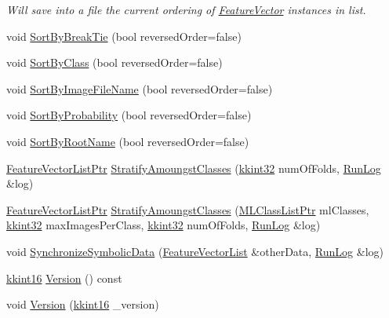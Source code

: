 \begin{DoxyCompactItemize}
\begin{DoxyCompactList}\small\item\em Will save into a file the current ordering of \hyperlink{class_k_k_m_l_l_1_1_feature_vector}{Feature\+Vector} instances in list. \end{DoxyCompactList}\item 
void \hyperlink{class_k_k_m_l_l_1_1_feature_vector_list_a21e87e9d54c668f6f2f4fd84500dcb19}{Sort\+By\+Break\+Tie} (bool reversed\+Order=false)
\item 
void \hyperlink{class_k_k_m_l_l_1_1_feature_vector_list_ad39ed98bffb33cdbb341b5f620b547c3}{Sort\+By\+Class} (bool reversed\+Order=false)
\item 
void \hyperlink{class_k_k_m_l_l_1_1_feature_vector_list_a3cfb8424a49a64301f25433e36446038}{Sort\+By\+Image\+File\+Name} (bool reversed\+Order=false)
\item 
void \hyperlink{class_k_k_m_l_l_1_1_feature_vector_list_aada2f3b4f406e863d5b9e29b3640d156}{Sort\+By\+Probability} (bool reversed\+Order=false)
\item 
void \hyperlink{class_k_k_m_l_l_1_1_feature_vector_list_a87e679a6419e6d7a1dc28a28d4cb96cb}{Sort\+By\+Root\+Name} (bool reversed\+Order=false)
\item 
\hyperlink{class_k_k_m_l_l_1_1_feature_vector_list_af22f34b214e0dd3b16760002ce392355}{Feature\+Vector\+List\+Ptr} \hyperlink{class_k_k_m_l_l_1_1_feature_vector_list_a10271db5b9466f45bb3ec138a05f209d}{Stratify\+Amoungst\+Classes} (\hyperlink{namespace_k_k_b_a8fa4952cc84fda1de4bec1fbdd8d5b1b}{kkint32} num\+Of\+Folds, \hyperlink{class_k_k_b_1_1_run_log}{Run\+Log} \&log)
\item 
\hyperlink{class_k_k_m_l_l_1_1_feature_vector_list_af22f34b214e0dd3b16760002ce392355}{Feature\+Vector\+List\+Ptr} \hyperlink{class_k_k_m_l_l_1_1_feature_vector_list_a06b49fcc006252682146bc5379790074}{Stratify\+Amoungst\+Classes} (\hyperlink{namespace_k_k_m_l_l_af091cde3f4a4315658b41a5e7583fc26}{M\+L\+Class\+List\+Ptr} ml\+Classes, \hyperlink{namespace_k_k_b_a8fa4952cc84fda1de4bec1fbdd8d5b1b}{kkint32} max\+Images\+Per\+Class, \hyperlink{namespace_k_k_b_a8fa4952cc84fda1de4bec1fbdd8d5b1b}{kkint32} num\+Of\+Folds, \hyperlink{class_k_k_b_1_1_run_log}{Run\+Log} \&log)
\item 
void \hyperlink{class_k_k_m_l_l_1_1_feature_vector_list_ae1d1b2ac35bcc178b7065fed6bb60cc0}{Synchronize\+Symbolic\+Data} (\hyperlink{class_k_k_m_l_l_1_1_feature_vector_list}{Feature\+Vector\+List} \&other\+Data, \hyperlink{class_k_k_b_1_1_run_log}{Run\+Log} \&log)
\item 
\hyperlink{namespace_k_k_b_a93809780ee294124dda4c23069f41248}{kkint16} \hyperlink{class_k_k_m_l_l_1_1_feature_vector_list_a01b3c7a97f5b58639c8aee826fa15dc9}{Version} () const 
\item 
void \hyperlink{class_k_k_m_l_l_1_1_feature_vector_list_a552ffa046dcc4c6d779b5ef442dcbb1d}{Version} (\hyperlink{namespace_k_k_b_a93809780ee294124dda4c23069f41248}{kkint16} \+\_\+version)
\end{DoxyCompactItemize}
